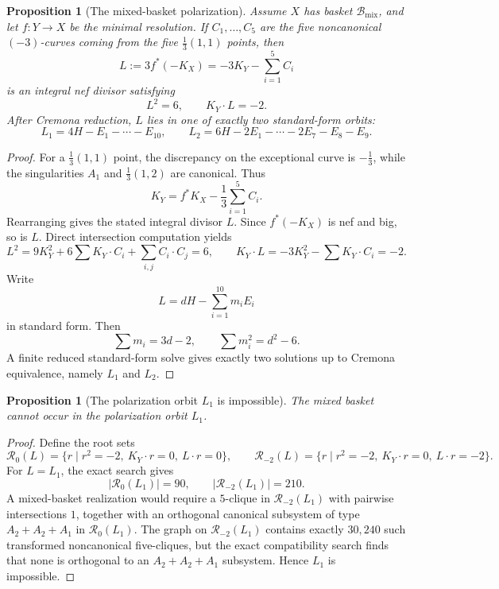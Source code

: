 \documentclass[11pt]{article}
\newtheorem{proposition}[theorem]{Proposition}
\theoremstyle{definition}
\begin{document}
\begin{proposition}[The mixed-basket polarization]\label{prop:mixed-polarization}
Assume $X$ has basket $\mathcal B_{\mathrm{mix}}$, and let $f\colon Y\to X$ be the minimal resolution. If $C_1,\dots,C_5$ are the five noncanonical $(-3)$-curves coming from the five $\frac13(1,1)$ points, then
\[
L:=3f^*(-K_X)=-3K_Y-\sum_{i=1}^5C_i
\]
is an integral nef divisor satisfying
\[
L^2=6,\qquad K_Y\cdot L=-2.
\]
After Cremona reduction, $L$ lies in one of exactly two standard-form orbits:
\[
L_1=4H-E_1-\cdots-E_{10},
\qquad
L_2=6H-2E_1-\cdots-2E_7-E_8-E_9.
\]
\end{proposition}

\begin{proof}
For a $\frac13(1,1)$ point, the discrepancy on the exceptional curve is $-\frac13$, while the singularities $A_1$ and $\frac13(1,2)$ are canonical. Thus
\[
K_Y=f^*K_X-\frac13\sum_{i=1}^5C_i.
\]
Rearranging gives the stated integral divisor $L$. Since $f^*(-K_X)$ is nef and big, so is $L$. Direct intersection computation yields
\[
L^2=9K_Y^2+6\sum K_Y\cdot C_i+\sum_{i,j}C_i\cdot C_j=6,
\qquad
K_Y\cdot L=-3K_Y^2-\sum K_Y\cdot C_i=-2.
\]
Write
\[
L=dH-\sum_{i=1}^{10}m_iE_i
\]
in standard form. Then
\[
\sum m_i=3d-2,
\qquad
\sum m_i^2=d^2-6.
\]
A finite reduced standard-form solve gives exactly two solutions up to Cremona equivalence, namely $L_1$ and $L_2$.
\end{proof}

\begin{proposition}[The polarization orbit $L_1$ is impossible]\label{prop:L1-impossible}
The mixed basket cannot occur in the polarization orbit $L_1$.
\end{proposition}

\begin{proof}
Define the root sets
\[
\mathcal R_0(L)=\{r\mid r^2=-2,\ K_Y\cdot r=0,\ L\cdot r=0\},
\qquad
\mathcal R_{-2}(L)=\{r\mid r^2=-2,\ K_Y\cdot r=0,\ L\cdot r=-2\}.
\]
For $L=L_1$, the exact search gives
\[
|\mathcal R_0(L_1)|=90,
\qquad
|\mathcal R_{-2}(L_1)|=210.
\]
A mixed-basket realization would require a $5$-clique in $\mathcal R_{-2}(L_1)$ with pairwise intersections $1$, together with an orthogonal canonical subsystem of type $A_2+A_2+A_1$ in $\mathcal R_0(L_1)$. The graph on $\mathcal R_{-2}(L_1)$ contains exactly $30{,}240$ such transformed noncanonical five-cliques, but the exact compatibility search finds that none is orthogonal to an $A_2+A_2+A_1$ subsystem. Hence $L_1$ is impossible.
\end{proof}
\end{document}

